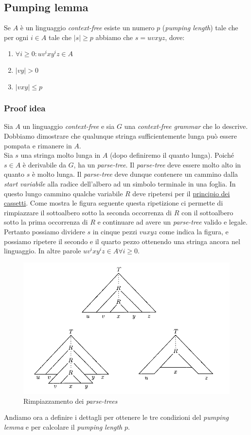 \documentclass[italian]{article}
\newcommand{\len}[1]{\text{$|#1|$}}
\begin{document}
	\subsection{Pumping lemma}
	Se $A$ è un linguaggio \textit{context-free} esiste un numero $p$ (\textit{pumping length}) tale che per ogni $i \in A$ tale che $\len{s} \geq p$ abbiamo che $s = uvxyz$, dove:
	\begin{enumerate}
		\item $\forall i \geq 0 : uv^ixy^iz \in A$
		\item $|vy| > 0$
		\item $|vxy| \leq p$		
	\end{enumerate}
	\subsubsection{Proof idea}
	Sia $A$ un linguaggio \textit{context-free} e sia $G$ una \textit{context-free grammar} che lo descrive. Dobbiamo dimostrare che qualunque stringa sufficientemente lunga può essere pompata e rimanere in $A$.\\
	
	\noindent
	Sia $s$ una stringa molto lunga in $A$ (dopo definiremo il quanto lunga). Poiché $s \in A$ è derivabile da $G$, ha un \textit{parse-tree}. Il \textit{parse-tree} deve essere molto alto in quanto $s$ è molto lunga. Il \textit{parse-tree} deve dunque contenere un cammino dalla \textit{start variabile} alla radice dell'albero ad un simbolo terminale in una foglia. In questo lungo cammino qualche variabile $R$ deve ripetersi per il \href{https://it.wikipedia.org/wiki/Principio_dei_cassetti}{principio dei cassetti}. Come mostra le figura seguente questa ripetizione ci permette di rimpiazzare il sottoalbero sotto la seconda occorrenza di $R$ con il sottoalbero sotto la prima occorrenza di $R$ e continuare ad avere un \textit{parse-tree} valido e legale. \\
	
	\noindent
	Pertanto possiamo dividere $s$ in cinque pezzi $vuxyz$ come indica la figura, e possiamo ripetere il secondo e il quarto pezzo ottenendo una stringa ancora nel linguaggio. In altre parole $uv^ixy^iz \in A \forall i \geq 0$. 
	\begin{figure}[h!]
		\centering
		\includegraphics[width=0.7\linewidth]{images/parse_tree_cfl}
		\caption[Rimpiazzamento dei \textit{parse-trees}]{Rimpiazzamento dei \textit{parse-trees}}
		\label{fig:parsetreecfl}
	\end{figure}
	\noindent
	Andiamo ora a definire i dettagli per ottenere le tre condizioni del \textit{pumping lemma} e per calcolare il \textit{pumping length} $p$.
\end{document}
